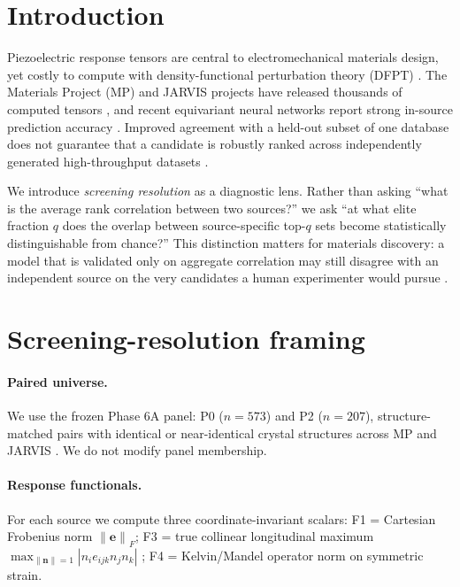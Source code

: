 \documentclass[11pt]{article}
\newcommand{\E}{\mathbf{e}}
\newcommand{\norm}[1]{\left\lVert #1 \right\rVert}
\begin{document}
\section{Introduction}
Piezoelectric response tensors are central to electromechanical materials design, yet costly to compute with density-functional perturbation theory (DFPT) \cite{baroni2001,togo2023}.
The Materials Project (MP) and JARVIS projects have released thousands of computed tensors \cite{dejong2015,choudhary2020}, and recent equivariant neural networks report strong in-source prediction accuracy \cite{yan2024,dong2025,batzner2022}.
Improved agreement with a held-out subset of one database does not guarantee that a candidate is robustly ranked across independently generated high-throughput datasets \cite{hegde2023,wagner2023,lyngby2024}.

We introduce \emph{screening resolution} as a diagnostic lens.
Rather than asking ``what is the average rank correlation between two sources?'' we ask ``at what elite fraction $q$ does the overlap between source-specific top-$q$ sets become statistically distinguishable from chance?''
This distinction matters for materials discovery: a model that is validated only on aggregate correlation may still disagree with an independent source on the very candidates a human experimenter would pursue \cite{kokkotou2023,graser2021,fu2023}.

\section{Screening-resolution framing}
\label{sec:methods}
\paragraph{Paired universe.}
We use the frozen Phase 6A panel: P0 ($n=573$) and P2 ($n=207$), structure-matched pairs with identical or near-identical crystal structures across MP and JARVIS \cite{jain2013,ong2013}.
We do not modify panel membership.

\paragraph{Response functionals.}
For each source we compute three coordinate-invariant scalars:
F1 = Cartesian Frobenius norm $\norm{\E}_F$;
F3 = true collinear longitudinal maximum $\max_{\norm{\bm n}=1} |n_i e_{ijk} n_j n_k|$ \cite{maxlongitudinal2021};
F4 = Kelvin/Mandel operator norm on symmetric strain.
\end{document}
